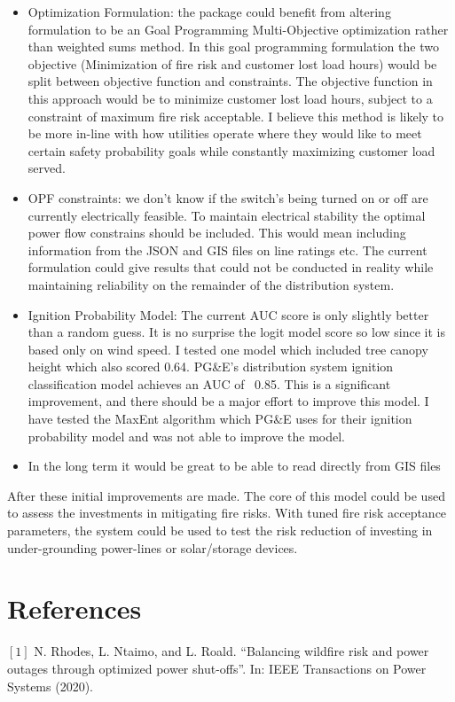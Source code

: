 \documentclass{article}
\begin{document}
\begin{itemize}
\item Optimization Formulation: the package could benefit from altering formulation to be an Goal Programming Multi-Objective optimization rather than weighted sums method. In this goal programming formulation the two objective (Minimization of fire risk and customer lost load hours) would be split between objective function and constraints. The objective function in this approach would be to minimize customer lost load hours, subject to a constraint of maximum fire risk acceptable. I believe this method is likely to be more in-line with how utilities operate where they would like to meet certain safety probability goals while constantly maximizing customer load served. 
\item OPF constraints: we don't know if the switch's being turned on or off are currently electrically feasible. To maintain electrical stability the optimal power flow constrains should be included. This would mean including information from the JSON and GIS files on line ratings etc. The current formulation could give results that could not be conducted in reality while maintaining reliability on the remainder of the distribution system. 
\item Ignition Probability Model: The current AUC score is only slightly better than a random guess. It is no surprise the logit model score so low since it is based only on wind speed. I tested one model which included tree canopy height which also scored 0.64. PG&E's distribution system ignition classification model achieves an AUC of ~0.85. This is a significant improvement, and there should be a major effort to improve this model. I have tested the MaxEnt algorithm which PG&E uses for their ignition probability model and was not able to improve the model. 
\item In the long term it would be great to be able to read directly from GIS files


\end{itemize}
After these initial improvements are made. The core of this model could be used to assess the investments in mitigating fire risks. With tuned fire risk acceptance parameters, the system could be used to test the risk reduction of investing in under-grounding power-lines or solar/storage devices.

\section{References}

$[1]$ N. Rhodes, L. Ntaimo, and L. Roald. “Balancing wildfire risk and power outages through optimized power shut-offs”. In: IEEE Transactions on Power Systems (2020).
\end{document}
